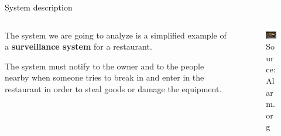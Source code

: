 \begin{frame}{System description}

  \begin{columns}
   \begin{column}{.50\textwidth}
  	\begin{center}
      The system we are going to analyze is a simplified example of a
      {\textcolor{green!40!black}{\fontsize{13}{15}\textbf{surveillance system}}}
      for a restaurant.

      \vskip 0.5cm

      The system must notify to the owner and to the people nearby when someone
      tries to break in and enter in the restaurant in order to steal goods or
      damage the equipment.
  	\end{center}
   \end{column}

   \begin{column}{.50\textwidth}
  	\begin{center}
      \begin{figure}[ht!]
        \centering
        \includegraphics[width=50mm]{images/Alarm.jpg}
        \caption{Source: Alarm.org}
      \end{figure}
  	\end{center}
  	\vskip 0.3cm
   \end{column}
 \end{columns}

\end{frame}

